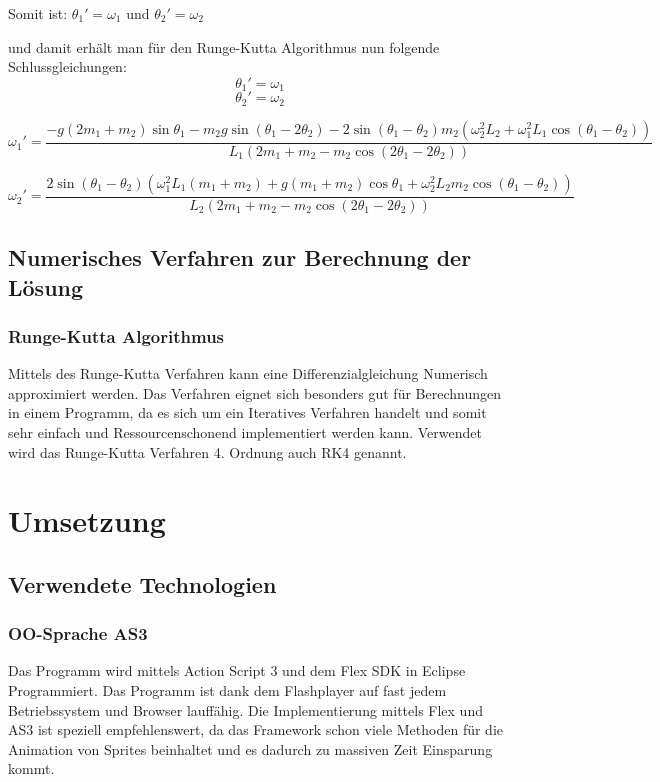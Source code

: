 \documentclass[12pt]{article}
\numberwithin{equation}{subsection}
\begin{document}
Somit ist:
$\theta_1' = \omega_1$
und
$\theta_2' = \omega_2$

und damit erhält man für den Runge-Kutta Algorithmus nun folgende Schlussgleichungen:
\begin{equation} \label{eq:rk:1}
	\theta_1' = \omega_1
\end{equation}
\begin{equation} \label{eq:rk:2}
	\theta_2' = \omega_2
\end{equation}

\begin{equation} \label{eq:rk:3}
	\omega_1' = \frac{-g(2m_1+m_2)\sin\theta_1 - m_2 g \sin(\theta_1 - 2\theta_2) -2\sin(\theta_1 - \theta_2)m_2(\omega_2^2 L_2 + \omega_1^2 L_1\cos(\theta_1 - \theta_2))}
	{L_1(2m_1 + m_2 - m_2 \cos(2\theta_1 - 2\theta_2))}
\end{equation}

\begin{equation} \label{eq:rk:4}
	\omega_2' = \frac{2\sin(\theta_1 - \theta_2)(\omega_1^2 L_1(m_1 + m_2) + g(m_1 + m_2)\cos\theta_1 + \omega_2^2 L_2 m_2 \cos(\theta_1 - \theta_2))}
	{L_2 (2m_1 + m_2 - m_2 \cos(2 \theta_1 - 2\theta_2))}
\end{equation}

\subsection{Numerisches Verfahren zur Berechnung der Lösung}
\subsubsection{Runge-Kutta Algorithmus} \label{cpt:rk}
Mittels des Runge-Kutta Verfahren kann eine Differenzialgleichung Numerisch approximiert werden. Das Verfahren eignet sich besonders gut für Berechnungen in einem Programm, da es sich um ein Iteratives Verfahren handelt und somit sehr einfach und Ressourcenschonend implementiert werden kann.
Verwendet wird das Runge-Kutta Verfahren 4. Ordnung auch RK4 genannt.

\newpage
\section{Umsetzung}
\subsection{Verwendete Technologien}
\subsubsection{OO-Sprache AS3}
Das Programm wird mittels Action Script 3 und dem Flex SDK in Eclipse Programmiert. Das Programm ist dank dem Flashplayer auf fast jedem Betriebssystem und Browser lauffähig.
Die Implementierung mittels Flex und AS3 ist speziell empfehlenswert, da das Framework schon viele Methoden für die Animation von Sprites beinhaltet und es dadurch zu massiven Zeit Einsparung kommt.
\end{document}

